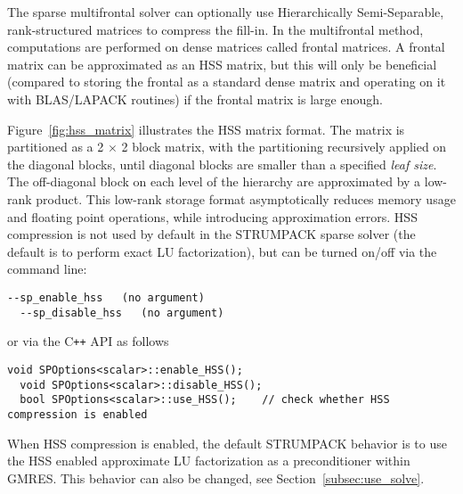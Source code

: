 \documentclass{article}
\begin{document}
The sparse multifrontal solver can optionally use Hierarchically
Semi-Separable, rank-structured matrices to compress the fill-in. In
the multifrontal method, computations are performed on dense matrices
called frontal matrices. A frontal matrix can be approximated as an
HSS matrix, but this will only be beneficial (compared to storing the
frontal as a standard dense matrix and operating on it with
BLAS/LAPACK routines) if the frontal matrix is large enough.

Figure~\ref{fig:hss_matrix} illustrates the HSS matrix format. The
matrix is partitioned as a 2 $\times$ 2 block matrix, with the
partitioning recursively applied on the diagonal blocks, until
diagonal blocks are smaller than a specified \emph{leaf size}. The
off-diagonal block on each level of the hierarchy are approximated by
a low-rank product. This low-rank storage format asymptotically
reduces memory usage and floating point operations, while introducing
approximation errors. HSS compression is not used by default in the
STRUMPACK sparse solver (the default is to perform exact LU
factorization), but can be turned on/off via the command line:
\begin{lstlisting}[style=Bash]
  --sp_enable_hss   (no argument)
  --sp_disable_hss   (no argument)
\end{lstlisting}
or via the C\texttt{++} API as follows
\begin{lstlisting}[style=C]
  void SPOptions<scalar>::enable_HSS();
  void SPOptions<scalar>::disable_HSS();
  bool SPOptions<scalar>::use_HSS();    // check whether HSS compression is enabled
\end{lstlisting}
When HSS compression is enabled, the default STRUMPACK behavior is to
use the HSS enabled approximate LU factorization as a preconditioner
within GMRES. This behavior can also be changed, see
Section~\ref{subsec:use_solve}.
\end{document}
